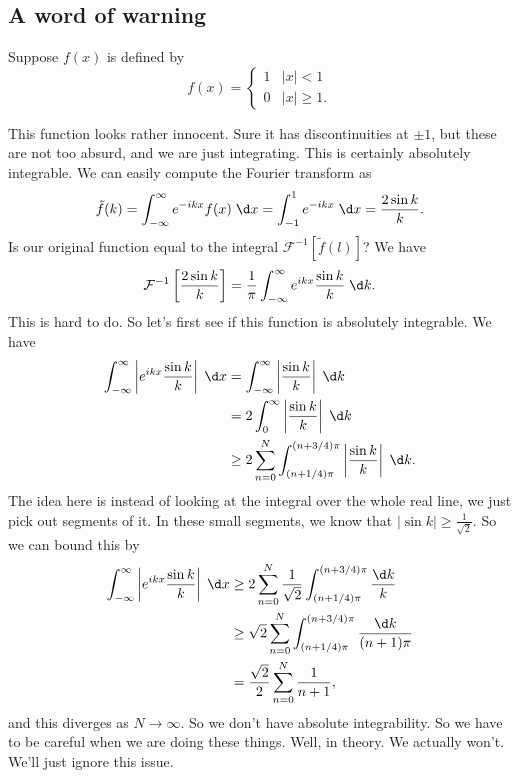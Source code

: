 \documentclass[a4paper]{article}
\begin{document}
\subsection{A word of warning}
Suppose $f(x)$ is defined by
\[
  f(x) =
  \begin{cases}
    1 & |x| < 1\\
    0 & |x| \geq 1.
  \end{cases}
\]
\begin{center}
\end{center}
This function looks rather innocent. Sure it has discontinuities at $\pm 1$, but these are not too absurd, and we are just integrating. This is certainly absolutely integrable. We can easily compute the Fourier transform as
\[
  \tilde{f}(k) = \int_{-\infty}^\infty e^{-ikx}f(x)\;\d x = \int_{-1}^1 e^{-ikx} \;\d x = \frac{2\sin k}{k}.
\]
Is our original function equal to the integral $\mathcal{F}^{-1}[\tilde{f}(l)]$? We have
\[
  \mathcal{F}^{-1}\left[\frac{2 \sin k}{k}\right] = \frac{1}{\pi} \int_{-\infty}^\infty e^{ikx} \frac{\sin k}{k} \;\d k.
\]
This is hard to do. So let's first see if this function is absolutely integrable. We have
\begin{align*}
  \int_{-\infty}^\infty \left|e^{ikx} \frac{\sin k}{k}\right|\;\d x &= \int_{-\infty}^\infty \left|\frac{\sin k}{k}\right|\;\d k\\
  &= 2 \int_0^\infty \left|\frac{\sin k}{k}\right|\;\d k\\
  &\geq 2 \sum_{n = 0}^N \int_{(n + 1/4) \pi}^{(n + 3/4)\pi} \left|\frac{\sin k}{k}\right|\;\d k.
\end{align*}
The idea here is instead of looking at the integral over the whole real line, we just pick out segments of it. In these small segments, we know that $|\sin k| \geq \frac{1}{\sqrt{2}}$. So we can bound this by
\begin{align*}
  \int_{-\infty}^\infty \left|e^{ikx} \frac{\sin k}{k}\right|\;\d x &\geq 2 \sum_{n = 0}^N \frac{1}{\sqrt{2}} \int_{(n + 1/4) \pi}^{(n + 3/4)\pi} \frac{\d k}{k}\\
  &\geq \sqrt{2} \sum_{n = 0}^N \int_{(n + 1/4) \pi}^{(n + 3/4)\pi} \frac{\d k}{(n + 1)\pi}\\
  &= \frac{\sqrt{2}}{2} \sum_{n = 0}^N \frac{1}{n + 1},
\end{align*}
and this diverges as $N \to \infty$. So we don't have absolute integrability. So we have to be careful when we are doing these things. Well, in theory. We actually won't. We'll just ignore this issue.
\end{document}
